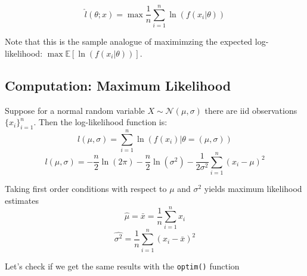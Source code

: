 \documentclass[11pt,]{article}
\newenvironment{Shaded}{\begin{snugshade}}{\end{snugshade}}
\newcommand{\KeywordTok}[1]{\textcolor[rgb]{0.13,0.29,0.53}{\textbf{#1}}}
\newcommand{\DataTypeTok}[1]{\textcolor[rgb]{0.13,0.29,0.53}{#1}}
\newcommand{\DecValTok}[1]{\textcolor[rgb]{0.00,0.00,0.81}{#1}}
\newcommand{\StringTok}[1]{\textcolor[rgb]{0.31,0.60,0.02}{#1}}
\newcommand{\CommentTok}[1]{\textcolor[rgb]{0.56,0.35,0.01}{\textit{#1}}}
\newcommand{\OtherTok}[1]{\textcolor[rgb]{0.56,0.35,0.01}{#1}}
\newcommand{\ControlFlowTok}[1]{\textcolor[rgb]{0.13,0.29,0.53}{\textbf{#1}}}
\newcommand{\OperatorTok}[1]{\textcolor[rgb]{0.81,0.36,0.00}{\textbf{#1}}}
\newcommand{\NormalTok}[1]{#1}
\begin{document}
\[\hat{l}(\theta; x) = \max{} \frac{1}{n}\sum_{i=1}^n \ln(f(x_i|\theta))\]

Note that this is the sample analogue of maximimzing the expected
log-likelihood: \(\max{} \mathbb{E}[\ln(f(x_i|\theta))]\).

\subsection{Computation: Maximum
Likelihood}\label{computation-maximum-likelihood}

Suppose for a normal random variable \(X\sim \mathcal{N}(\mu,\sigma)\)
there are iid observations \(\{x_i\}_{i=1}^n\). Then the log-likelihood
function is:
\[l(\mu, \sigma)=\sum_{i = 1}^n \ln(f(x_i)|\theta=(\mu, \sigma))\]
\[l(\mu, \sigma)=-\frac{n}{2}\ln(2\pi)-\frac{n}{2}\ln(\sigma^2)-
\frac{1}{2\sigma^2}\sum_{i=1}^n (x_i-\mu)^2\]

Taking first order conditions with respect to \(\mu\) and \(\sigma^2\)
yields maximum likelihood estimates
\[\hat{\mu} = \bar{x} = \frac{1}{n}\sum_{i=1}^n x_i\]
\[\widehat{\sigma^2} = \frac{1}{n}\sum_{i=1}^n (x_i-\bar{x})^2\]

Let's check if we get the same results with the \texttt{optim()}
function

\begin{Shaded}
\end{Shaded}
\end{document}
